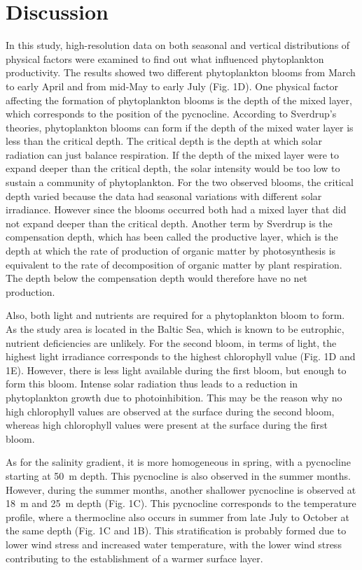 \documentclass[../Main.tex]{subfiles}
\begin{document}
\section*{\crule[blue]{.3cm}{.3cm} Discussion}
In this study, high-resolution data on both seasonal and vertical distributions of physical factors were examined to find out what influenced phytoplankton productivity. The results showed two different phytoplankton blooms from March to early April and from mid-May to early July (Fig. 1D). One physical factor affecting the formation of phytoplankton blooms is the depth of the mixed layer, which corresponds to the position of the pycnocline.  
According to Sverdrup's theories, phytoplankton blooms can form if the depth of the mixed water layer is less than the critical depth\supercite{Sverdrup1953OnCF}. The critical depth is the depth at which solar radiation can just balance respiration. If the depth of the mixed layer were to expand deeper than the critical depth, the solar intensity would be too low to sustain a community of phytoplankton. For the two observed blooms, the critical depth varied because the data had seasonal variations with different solar irradiance. 
However since the blooms occurred both had a mixed layer that did not expand deeper than the critical depth. Another term by Sverdrup is the compensation depth, which has been called the productive layer, which is the depth at which the rate of production of organic matter by photosynthesis is equivalent to the rate of decomposition of organic matter by plant respiration\supercite{Sverdrup1953OnCF}. 
The depth below the compensation depth would therefore have no net production. 

Also, both light and nutrients are required for a phytoplankton bloom to form\supercite{munkes2021cyanobacteria}. 
As the study area is located in the Baltic Sea, which is known to be eutrophic, nutrient deficiencies are unlikely\supercite{munkes2021cyanobacteria}. 
For the second bloom, in terms of light, the highest light irradiance corresponds to the highest chlorophyll value (Fig. 1D and 1E). However, there is less light available during the first bloom, but enough to form this bloom. Intense solar radiation thus leads to a reduction in phytoplankton growth due to photoinhibition\supercite{edwards2016phytoplankton}. 
This may be the reason why no high chlorophyll values are observed at the surface during the second bloom, whereas high chlorophyll values were present at the surface during the first bloom. 

As for the salinity gradient, it is more homogeneous in spring, with a pycnocline starting at \SI{50}{m} depth. This pycnocline is also observed in the summer months. However, during the summer months, another shallower pycnocline is observed at \SI{18}{m} and \SI{25}{m} depth (Fig. 1C). This pycnocline corresponds to the temperature profile, where a thermocline also occurs in summer from late July to October at the same depth (Fig. 1C and 1B). This stratification is probably formed due to lower wind stress and increased water temperature, with the lower wind stress contributing to the establishment of a warmer surface layer\supercite{carey2012eco}.
\end{document}
